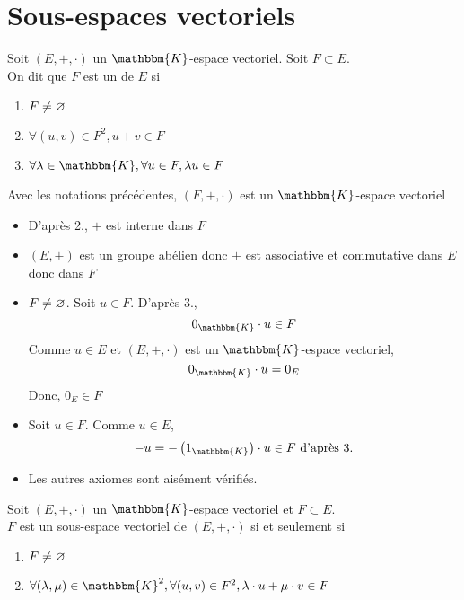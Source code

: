 \part{Sous-espaces vectoriels}

\begin{defn}
	Soit $(E,+,\cdot)$ un $\mathbbm{K}$-espace vectoriel. Soit $F \subset E$.\\
	On dit que $F$ est un  de $E$ si
	\begin{enumerate}
		\item $F \neq \varnothing$
		\item $\forall (u,v) \in F^2, u + v \in F$ 
		\item $\forall \lambda \in \mathbbm{K}, \forall u \in F, \lambda u \in F$
	\end{enumerate}
\end{defn}

\begin{prop}
	Avec les notations précédentes, $(F,+,\cdot)$ est un $\mathbbm{K}$-espace vectoriel
\end{prop}

\begin{prv}
	\begin{itemize}
		\item D'après 2., $+$ est interne dans $F$ 
		\item $(E,+)$ est un groupe abélien donc $+$ est associative et commutative dans $E$ donc dans $F$
		\item  $F \neq \varnothing$. Soit $u \in F$. D'après 3., \[
				0_\mathbbm{K} \cdot u \in F
			\] Comme $u \in E$ et $(E, +, \cdot )$ est un $\mathbbm{K}$-espace vectoriel, \[
			0_\mathbbm{K} \cdot u = 0_E
			\] Donc, $0_E \in F$ 
		\item Soit $u \in F$. Comme $u \in E$, \[
				-u = -\left( 1_\mathbbm{K} \right) \cdot u \in F \text{ d'après 3.}
			\]
		\item Les autres axiomes sont aisément vérifiés.
	\end{itemize}
\end{prv}

\begin{prop}
	Soit $(E,+,\cdot)$ un $\mathbbm{K}$-espace vectoriel et $F\subset E$.\\
	$F$ est un sous-espace vectoriel de $(E,+,\cdot)$ si et seulement si
	\begin{enumerate}
		\item $F \neq \varnothing$
		\item $\forall (\lambda,\mu) \in \mathbbm{K}^2, \forall (u,v) \in F^2, \lambda\cdot u + \mu\cdot v \in F$
	\end{enumerate}
\end{prop}

